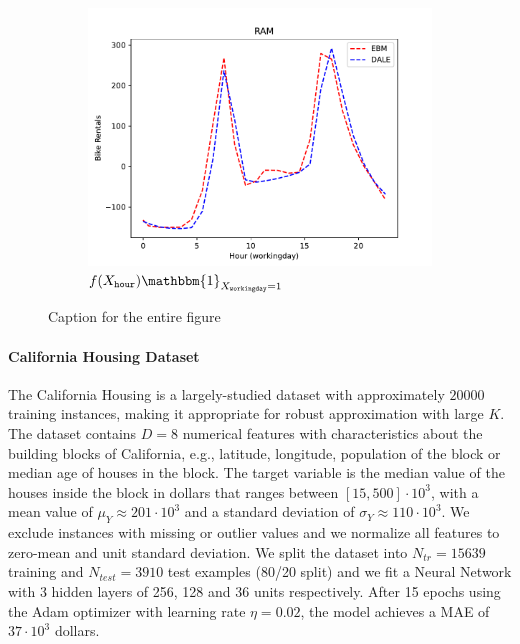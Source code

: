 \documentclass[12pt]{article}
\newcommand{\when}[1]{\mathbbm{1}_{#1}}
\begin{document}
\begin{figure}[htbp]
    \begin{subfigure}{0.32\textwidth}
        \centering
        \includegraphics[width=\textwidth]{figures/bike_rentals_ram_2}
        \caption{\(f(X_{\mathtt{hour}}) \when{X_{\mathtt{workingday}} = 1}\)}
        \label{subfig:bike_rentals_regional_gam_2}
    \end{subfigure}
    \caption{Caption for the entire figure}
    \label{fig:bike_sharing}
\end{figure}


\paragraph{California Housing Dataset}
The California Housing is a largely-studied dataset with approximately
\(20000\) training instances, making it appropriate for robust
approximation with large \(K\).  The dataset contains \(D=8\)
numerical features with characteristics about the building blocks of
California, e.g., latitude, longitude, population of the block or
median age of houses in the block.  The target variable is the median
value of the houses inside the block in dollars that ranges between
\([15, 500] \cdot 10^3\), with a mean value of
\(\mu_Y \approx 201 \cdot 10^3 \) and a standard deviation of
\(\sigma_Y \approx 110 \cdot 10^3\). We exclude instances with missing
or outlier values and we normalize all features to zero-mean and unit
standard deviation. We split the dataset into \(N_{tr} = 15639\)
training and \(N_{test} = 3910\) test examples (80/20 split) and we
fit a Neural Network with 3 hidden layers of 256, 128 and 36 units
respectively.  After 15 epochs using the Adam optimizer with learning
rate \(\eta = 0.02\), the model achieves a MAE of \(37 \cdot 10^3\)
dollars.
\end{document}
